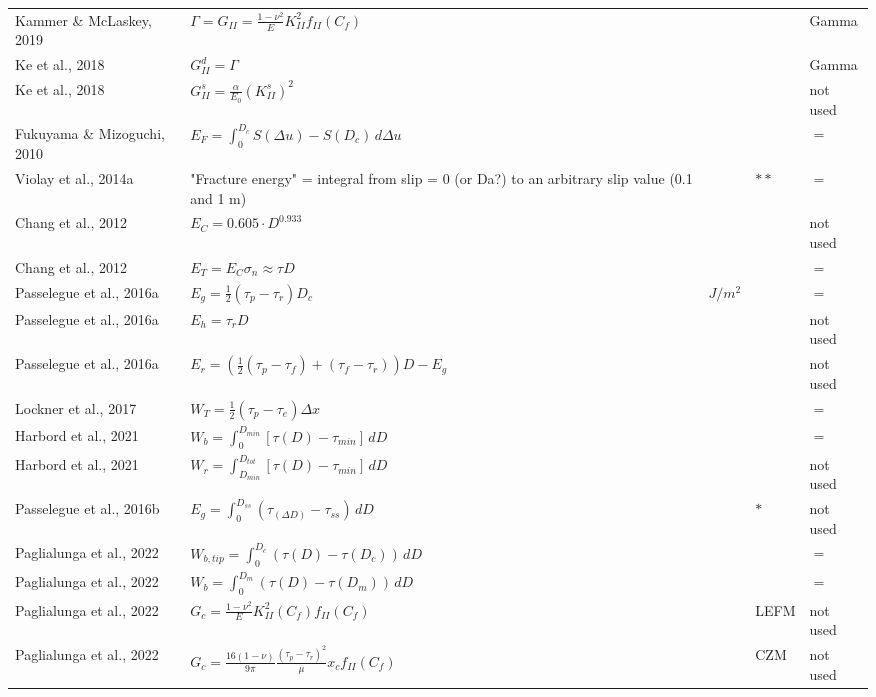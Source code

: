 \documentclass{article}
\begin{document}
\begin{longtable}{|p{4 cm}|p{8 cm}|p{1.25 cm}|p{1.25 cm}|p{1.5 cm}|}
Kammer \& McLaskey, 2019 & \( \displaystyle \Gamma = G_{II} = \frac{1-\nu^2}{E} K_{II}^2 f_{II}(C_f)\) & & & Gamma \\
Ke et al., 2018 & \( \displaystyle G_{II}^d = \Gamma \) & & & Gamma \\
Ke et al., 2018 & \( \displaystyle G_{II}^s = \frac{\alpha}{E_0} (K_{II}^s)^2 \) & & & not used \\
Fukuyama \& Mizoguchi, 2010 & \( \displaystyle E_F = \int_{0}^{D_c} S(\Delta u) - S(D_c) \,d \Delta u \) & & & $=$ \\
Violay et al., 2014a & "Fracture energy" = integral from slip = 0 (or Da?) to an arbitrary slip value (0.1 and 1 m) & & $**$ & $=$ \\
Chang et al., 2012 & \( \displaystyle E_C = 0.605 \cdot D^{0.933} \) & & & not used \\
Chang et al., 2012 & \( \displaystyle E_T = E_C \sigma_n \approx \tau D\) & & & $=$ \\
Passelegue et al., 2016a & \( \displaystyle E_g = \frac{1}{2} (\tau_p - \tau_r) D_c \) & $J/m^2$ & & $=$ \\
Passelegue et al., 2016a & \( \displaystyle E_h = \tau_r D \) & & & not used \\
Passelegue et al., 2016a & \( \displaystyle E_r = \left ( \frac{1}{2} (\tau_p - \tau_f) + (\tau_f - \tau_r) \right ) D - E_g  \) & & & not used \\
Lockner et al., 2017 & \( \displaystyle W_T = \frac{1}{2} (\tau_p - \tau_e) \Delta x \) & & & $=$ \\
Harbord et al., 2021 & \( \displaystyle W_b = \int_{0}^{D_{min}} [\tau(D) - \tau_{min}] \,d D \) & & & $=$ \\
Harbord et al., 2021 & \( \displaystyle W_r = \int_{D_{min}}^{D_{tot}} [\tau(D) - \tau_{min}] \,d D \) & & & not used \\
Passelegue et al., 2016b & \( \displaystyle E_g = \int_{0}^{D_{ss}} (\tau_{(\Delta D)} - \tau_{ss}) \,d D \) & & $*$ & not used \\
Paglialunga et al., 2022 & \( \displaystyle W_{b,tip} = \int_{0}^{D_c} (\tau(D)-\tau(D_c)) \,d D \) & & & $=$ \\
Paglialunga et al., 2022 & \( \displaystyle W_b = \int_{0}^{D_m} (\tau(D)-\tau(D_m)) \,d D \) & & & $=$ \\
Paglialunga et al., 2022 & \( \displaystyle G_c = \frac{1-\nu^2}{E} K_{II}^2 (C_f) f_{II} (C_f)\) & & LEFM & not used \\
Paglialunga et al., 2022 & \( \displaystyle G_c = \frac{16(1-\nu)}{9\pi} \frac{(\tau_p-\tau_r)^2}{\mu} x_c f_{II} (C_f) \) & & CZM & not used \\

\end{longtable}
\end{document}
